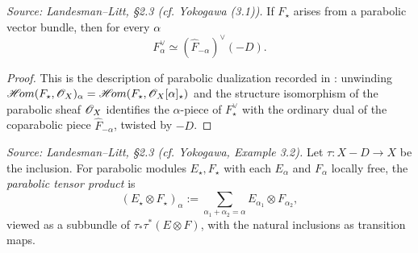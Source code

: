 \begin{lemma}
  \label{lem:parabolic-dual-formula}
  \textit{Source: Landesman--Litt, \S2.3 (cf. Yokogawa (3.1)).}
  If $F_\star$ arises from a parabolic vector bundle, then for every $\alpha$
  \[
    F^\vee_\alpha \simeq \left(\widehat{F}_{-\alpha}\right)^\vee(-D) .
  \]
\end{lemma}

\begin{proof}
  This is the description of parabolic dualization recorded in
  \cite[(3.1)]{yokogawa:infinitesimal-deformation}: unwinding
  $\mathop{\mathscr{H}\!om}(F_\star, \mathscr{O}_X)_\alpha = \mathop{\mathscr{H}\!om}(F_\star, \mathscr{O}_X[\alpha]_\star)$ and
  the structure isomorphism of the parabolic sheaf $\mathscr{O}_X$ identifies the
  $\alpha$-piece of $F^\vee_\star$ with the ordinary dual of the coparabolic
  piece $\widehat{F}_{-\alpha}$, twisted by $-D$.
\end{proof}

\begin{definition}
  \label{def:parabolic-tensor}
  \textit{Source: Landesman--Litt, \S2.3 (cf. Yokogawa, Example 3.2).}
  Let $\tau : X - D \to X$ be the inclusion. For parabolic modules
  $E_\star, F_\star$ with each $E_\alpha$ and $F_\alpha$ locally free, the
  \emph{parabolic tensor product} is
  \[
    (E_\star \otimes F_\star)_\alpha := \sum_{\alpha_1 + \alpha_2 = \alpha}
      E_{\alpha_1} \otimes F_{\alpha_2} ,
  \]
  viewed as a subbundle of $\tau_* \tau^*(E \otimes F)$, with the natural
  inclusions as transition maps.
\end{definition}

